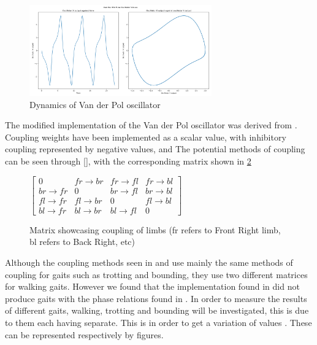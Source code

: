 \begin{figure}
    \centering
    \includegraphics[width=0.7\textwidth]{USFD_Academic-_Report_LaTeX-Template/figures/oscillatoroutput.png}
    \caption{Dynamics of Van der Pol oscillator}
    \label{fig:vandynamics}
\end{figure}


The modified implementation of the Van der Pol oscillator was derived from \cite{}. Coupling weights have been implemented as a scalar value, with inhibitory coupling represented by negative values, and The potential methods of coupling can be seen through \ref{}, with the corresponding matrix shown in \ref{mat:coupling}

\begin{figure}
    \centering
    $\begin{bmatrix}
    0 & fr \rightarrow br & fr\rightarrow fl & fr\rightarrow bl \\
    br\rightarrow fr & 0 & br\rightarrow fl & br\rightarrow bl \\
    fl\rightarrow fr & fl\rightarrow br & 0 & fl\rightarrow  bl \\
    bl\rightarrow fr & bl\rightarrow br & bl\rightarrow fl & 0 
    \end{bmatrix}$
    \caption{Matrix showcasing coupling of limbs (fr refers to Front Right limb, bl refers to Back Right, etc)}
    \label{mat:coupling}
\end{figure}


Although the coupling methods seen in \cite{} and \cite{} use mainly the same methods of coupling for gaits such as trotting and bounding, they use two different matrices for walking gaits. However we found that the implementation found in \cite{} did not produce gaits with the phase relations found in \cite{}. In order to measure the results of different gaits, walking, trotting and bounding will be investigated, this is due to them each having separate. This is in order to get a variation of values . These can be represented respectively by figures.

